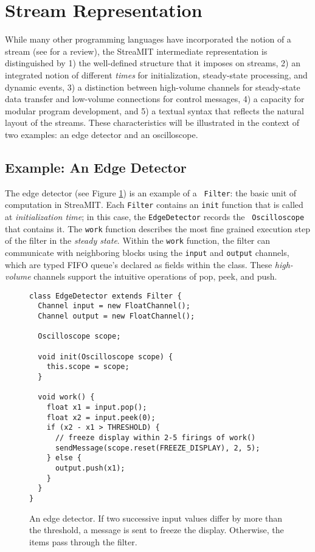 \documentclass[10pt]{article}
\begin{document}
\section{Stream Representation}

While many other programming languages have incorporated the notion of
a stream (see  for a review), the StreaMIT intermediate
representation is distinguished by 1) the well-defined structure that
it imposes on streams, 2) an integrated notion of different {\it
times} for initialization, steady-state processing, and dynamic
events, 3) a distinction between high-volume channels for steady-state
data transfer and low-volume connections for control messages, 4) a
capacity for modular program development, and 5) a textual syntax that
reflects the natural layout of the streams.  These characteristics
will be illustrated in the context of two examples: an edge detector
and an oscilloscope.

\subsection{Example: An Edge Detector}

The edge detector (see Figure \ref{fig1}) is an example of a {\tt
Filter}: the basic unit of computation in StreaMIT.  Each {\tt Filter}
contains an {\tt init} function that is called at {\it initialization
time}; in this case, the {\tt EdgeDetector} records the {\tt
Oscilloscope} that contains it.  The {\tt work} function describes the
most fine grained execution step of the filter in the {\it steady
state}.  Within the {\tt work} function, the filter can communicate
with neighboring blocks using the {\tt input} and {\tt output}
channels, which are typed FIFO queue's declared as fields within the
class.  These {\it high-volume} channels support the intuitive
operations of pop, peek, and push.

\begin{figure}[t]
\scriptsize
\begin{verbatim}
class EdgeDetector extends Filter {
  Channel input = new FloatChannel();
  Channel output = new FloatChannel();
  
  Oscilloscope scope;

  void init(Oscilloscope scope) {
    this.scope = scope;
  }

  void work() {
    float x1 = input.pop();
    float x2 = input.peek(0);
    if (x2 - x1 > THRESHOLD) {
      // freeze display within 2-5 firings of work()
      sendMessage(scope.reset(FREEZE_DISPLAY), 2, 5);
    } else {
      output.push(x1);
    }
  }
}
\end{verbatim}
\vspace{-12pt}
\caption{\protect\small An edge detector.  If two successive input
values differ by more than the threshold, a message is sent to freeze
the display.  Otherwise, the items pass through the filter.
\protect\label{fig1}}
\vspace{-12pt}
\end{figure}
\end{document}
